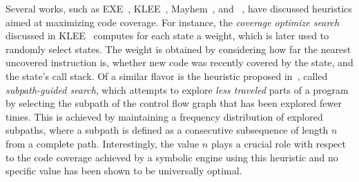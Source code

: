 Several works, such as {\sc EXE}~\cite{EXE-CCS06}, {\sc KLEE}~\cite{KLEE-OSDI08}, {\sc Mayhem}~\cite{MAYHEM-SP12}, and {\sc \stwoe}~\cite{CKC-TOCS12}, have discussed heuristics aimed at maximizing code coverage. For instance, the {\em coverage optimize search} discussed in {\sc KLEE}~\cite{KLEE-OSDI08} computes for each state a weight, which is later used to randomly select states. The weight is obtained by considering how far the nearest uncovered instruction is, whether new code was recently covered by the state, and the state's call stack. Of a similar flavor is the heuristic proposed in~\cite{LZL-OOPSLA13}, called {\em subpath-guided search}, which attempts to explore {\it less traveled} parts of a program by selecting the subpath of the control flow graph that has been explored fewer times. This is achieved by maintaining a frequency distribution of explored subpaths, where a subpath is defined as a consecutive subsequence of length $n$ from a complete path. Interestingly, the value $n$ plays a crucial role with respect to the code coverage achieved by a symbolic engine using this heuristic and no specific value has been shown to be universally optimal. %


